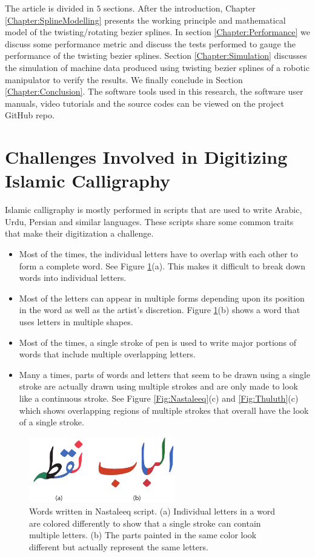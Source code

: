 {    The article is divided in $5$ sections. After the introduction, Chapter \ref{Chapter:SplineModelling} presents the working principle and mathematical model of the twisting/rotating bezier splines. In section \ref{Chapter:Performance} we discuss some performance metric and discuss the tests performed to gauge the performance of the twisting bezier splines. Section \ref{Chapter:Simulation} discusses the simulation of machine data produced using twisting bezier splines of a robotic manipulator to verify the results. We finally conclude in Section \ref{Chapter:Conclusion}. The software tools used in this research, the software user manuals, video tutorials and the source codes can be viewed on the project GitHub repo\cite{bib20}.
}
\section{Challenges Involved in Digitizing Islamic Calligraphy}
{
    \noindent Islamic calligraphy is mostly performed in scripts that are used to write Arabic, Urdu, Persian and similar languages. These scripts share some common traits that make their digitization a challenge.

    \begin{itemize}
    \item Most of the times, the individual letters have to overlap with each other to form a complete word. See Figure \ref{Fig:UrduScriptBreakDown}(a). This makes it difficult to break down words into individual letters.
    \item Most of the letters can appear in multiple forms depending upon its position in the word as well as the artist's discretion. Figure \ref{Fig:UrduScriptBreakDown}(b) shows a word that uses letters in multiple shapes. 
    \item Most of the times, a single stroke of pen is used to write major portions of words that include multiple overlapping letters. 
    \item Many a times, parts of words and letters that seem to be drawn using a single stroke are actually drawn using multiple strokes and are only made to look like a continuous stroke. See Figure \ref{Fig:Nastaleeq}(c) and \ref{Fig:Thuluth}(c) which shows overlapping regions of multiple strokes that overall have the look of a single stroke.
    \end{itemize}

    \begin{figure}[!t]
        \centering
        \includegraphics[width=2.5in]{../Images/Nuqtah.pdf}
        \caption{Words written in Nastaleeq script. (a) Individual letters in a word are colored differently to show that a single stroke can contain multiple letters. (b) The parts painted in the same color look different but actually represent the same letters.}
        \label{Fig:UrduScriptBreakDown}
    \end{figure}

}
